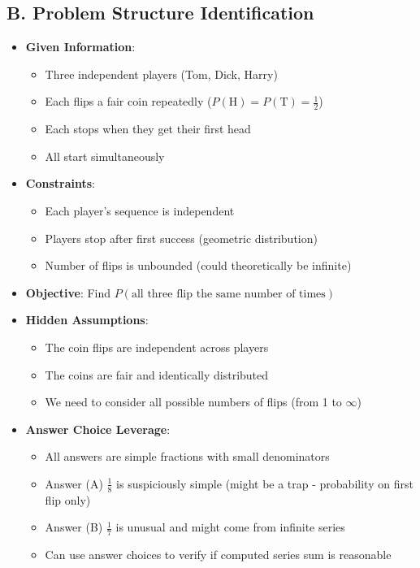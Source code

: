 \documentclass[11pt]{article}
\begin{document}
\begin{problemconfigbox}
\subsection*{B. Problem Structure Identification}
\begin{itemize}[leftmargin=*]
    \item \textbf{Given Information}: 
    \begin{itemize}
        \item Three independent players (Tom, Dick, Harry)
        \item Each flips a fair coin repeatedly ($P(\text{H}) = P(\text{T}) = \frac{1}{2}$)
        \item Each stops when they get their first head
        \item All start simultaneously
    \end{itemize}
    \item \textbf{Constraints}: 
    \begin{itemize}
        \item Each player's sequence is independent
        \item Players stop after first success (geometric distribution)
        \item Number of flips is unbounded (could theoretically be infinite)
    \end{itemize}
    \item \textbf{Objective}: Find $P(\text{all three flip the same number of times})$
    \item \textbf{Hidden Assumptions}: 
    \begin{itemize}
        \item The coin flips are independent across players
        \item The coins are fair and identically distributed
        \item We need to consider all possible numbers of flips (from 1 to $\infty$)
    \end{itemize}
    \item \textbf{Answer Choice Leverage}: 
    \begin{itemize}
        \item All answers are simple fractions with small denominators
        \item Answer (A) $\frac{1}{8}$ is suspiciously simple (might be a trap - probability on first flip only)
        \item Answer (B) $\frac{1}{7}$ is unusual and might come from infinite series
        \item Can use answer choices to verify if computed series sum is reasonable
    \end{itemize}
\end{itemize}


\end{problemconfigbox}
\end{document}
